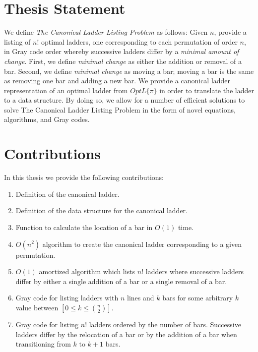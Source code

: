 \section{Thesis Statement}
 We define \emph{The Canonical Ladder Listing Problem} as follows: 
Given $n$, provide a listing of $n!$ optimal ladders,
one corresponding to each permutation of order $n$, in Gray code order whereby successive ladders differ by a \emph{minimal amount of change}. 
First, we define \emph{minimal change} as either the addition  or removal of a bar. 
Second, we define \emph{minimal change} as moving a bar; moving a bar is the same as removing one bar and adding a new bar. 
We provide a canonical ladder representation of an optimal ladder from $OptL\{\pi\}$ in order to translate the ladder to a data structure. 
By doing so, we allow for a number of efficient solutions to solve The Canonical Ladder Listing Problem in the form of novel equations, 
algorithms, and Gray codes. 
	

	

	

\section{Contributions}
In this thesis we provide the following contributions:
	\begin{enumerate}
    \item Definition of the canonical ladder.
    \item Definition of the data structure for the canonical ladder. 
    \item Function to calculate the location of a bar 
   in $O(1)$ time.
    \item $O(n^2)$ algorithm to create the canonical ladder corresponding to a given permutation.
    \item $O(1)$ amortized algorithm which lists $n!$ ladders where successive ladders differ by either a single  addition of a bar or a single removal of a bar.
    \item Gray code for listing ladders with $n$ lines and $k$ bars for some arbitrary $k$ value between $[0 \leq k \leq {n \choose 2}]$. 
    \item Gray code for listing $n!$ ladders ordered by the number of bars. Successive ladders differ by the relocation of a bar or by the 
    addition of a bar when transitioning from $k$ to $k+1$ bars.
\end{enumerate}
	

